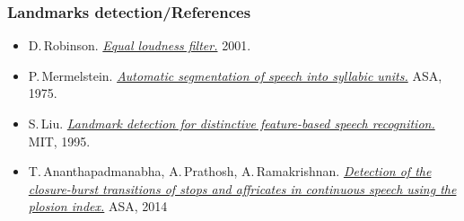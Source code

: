 \begin{frame} %
	\frametitle{Landmarks detection/References}
	\begin{itemize}
		\item D.\,Robinson. \href{http://replaygain.hydrogenaud.io/proposal/equal_loudness.html}{\emph{Equal loudness filter.}} 2001.
		\item P.\,Mermelstein. \href{http://dx.doi.org/10.1121/1.380738}{\emph{Automatic segmentation of speech into syllabic units.}} ASA, 1975.
		\item S.\,Liu. \href{http://dx.doi.org/1721.1/29188}{\emph{Landmark detection for distinctive feature-based speech recognition.}} MIT, 1995.
		\item T.\,Ananthapadmanabha, A.\,Prathosh, A.\,Ramakrishnan. \href{http://dx.doi.org/10.1121/1.4836055}{\emph{Detection of the closure-burst transitions of stops and affricates in continuous speech using the plosion index.}} ASA, 2014
	\end{itemize}
\end{frame}
